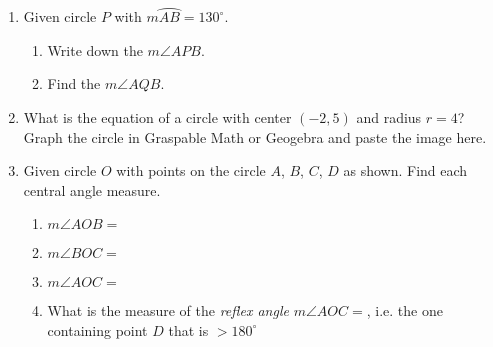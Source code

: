 \documentclass[12pt, twoside]{article}
\begin{document}
\begin{enumerate}
\newpage
\item Given circle $P$ with $m \wideparen{AB}=130^\circ$.
  \begin{multicols}{2}
    \raggedcolumns
    \begin{enumerate}
      \item Write down the $m\angle APB$. \vspace{1.7cm}
      \item Find the $m\angle AQB$. \vspace{2cm}
    \end{enumerate}
  \end{multicols}

\newpage
\item What is the equation of a circle with center $(-2,5)$ and radius $r=4$?\\[0.5cm]
Graph the circle in Graspable Math or Geogebra and paste the image here.

\newpage
\item Given circle $O$ with points on the circle $A$, $B$, $C$, $D$ as shown. Find each central angle measure.
  \begin{multicols}{2}
    \begin{enumerate} 
      \item $m\angle AOB =$
      \item $m\angle BOC =$
      \item $m\angle AOC =$
      \item What is the measure of the \emph{reflex angle} $m\angle AOC =$, i.e. the one containing point $D$ that is $>180^\circ$
      \end{enumerate}
  \end{multicols}


\end{enumerate}
\end{document}
